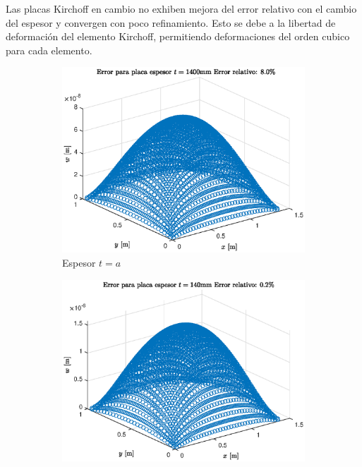 \documentclass[onecolumn,10pt,titlepage]{article}
\begin{document}
Las placas Kirchoff en cambio no exhiben mejora del error relativo con el cambio del espesor y convergen con poco refinamiento. Esto se debe a la libertad de deformación del elemento Kirchoff, permitiendo deformaciones del orden cubico para cada elemento.

 \begin{figure}[htb!]
 \centering
 \begin{subfigure}{.33\textwidth}
   \centering
   \includegraphics[width=\linewidth]{fig/t1_Error.eps}
   \caption{Espesor $t=a$}
   \label{fig:Minderrort1}
 \end{subfigure}%
 \begin{subfigure}{.33\textwidth}
   \centering
   \includegraphics[width=\linewidth]{fig/t10_Error.eps}

\end{subfigure}
\end{figure}
\end{document}

